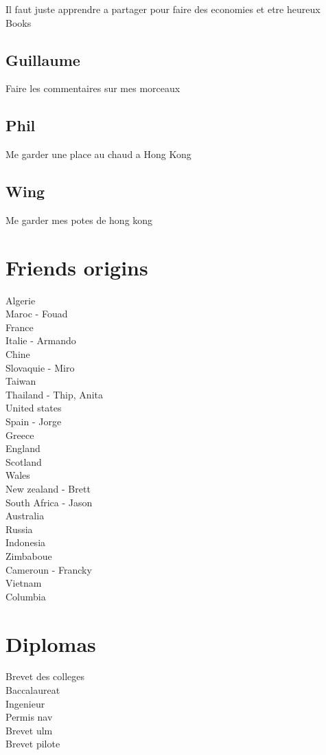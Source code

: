 \documentclass[8pt]{article} %
\begin{document}
Il faut juste apprendre a partager pour faire des economies et etre heureux\\

Books			\\
	
\subsection{Guillaume}
	Faire les commentaires sur mes morceaux
		
\subsection{Phil}
	Me garder une place au chaud a Hong Kong

\subsection{Wing}
	Me garder mes potes de hong kong

\section{Friends origins}
Algerie			\\
Maroc - Fouad			\\
France			\\
Italie	- Armando		\\
Chine			\\
Slovaquie	- Miro		\\
Taiwan			\\
Thailand	- Thip, Anita	\\
United states			\\
Spain		- Jorge	\\
Greece\\	
England			\\
Scotland			\\
Wales			\\
New zealand	- Brett		\\
South Africa	- Jason		\\
Australia			\\
Russia			\\
Indonesia			\\
Zimbaboue			\\
Cameroun	- Francky		\\
Vietnam			\\
Columbia			\\

\section{Diplomas}
Brevet des colleges			\\
Baccalaureat			\\
Ingenieur			\\
Permis nav			\\
Brevet ulm			\\
Brevet pilote			\\
\end{document}
